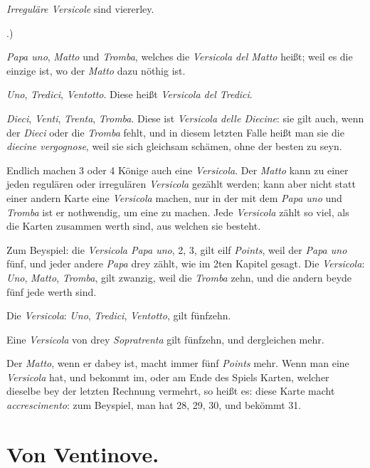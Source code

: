 \documentclass[11pt,a6paper,twoside]{article}
\renewenvironment{enumerate}{
  \begin{list}
    {\textsc{\arabic{enumi}}.)}
    {\usecounter{enumi}
      \setlength{\labelwidth}{2em}
      \setlength{\labelsep}{0.5em}
      \setlength{\itemsep}{0pt}
      \setlength{\parsep}{0pt}
      \setlength{\leftmargin}{1.5em}
      \setlength{\itemindent}{0em} %
    }
}{\end{list}}
\begin{document}
\textit{Irreguläre Versicole} sind viererley.
\begin{enumerate}
\item \textit{Papa uno}, \textit{Matto} und \textit{Tromba}, welches die \textit{Versicola del Matto} heißt; weil es die einzige ist, wo der \textit{Matto} dazu nöthig ist.
\item \textit{Uno}, \textit{Tredici}, \textit{Ventotto}. Diese heißt \textit{Versicola del Tredici}.
\item \textit{Dieci}, \textit{Venti}, \textit{Trenta}, \textit{Tromba}. Diese ist \textit{Versicola delle Diecine}: sie gilt auch, wenn der \textit{Dieci} oder die \textit{Tromba} fehlt, und in diesem letzten Falle heißt man sie die \textit{diecine vergognose}, weil sie sich gleichsam schämen, ohne der besten zu seyn.
\item Endlich machen 3 oder 4 Könige auch eine \textit{Versicola}. Der \textit{Matto} kann zu einer jeden regulären oder irregulären \textit{Versicola} gezählt werden; kann aber nicht statt einer andern Karte eine \textit{Versicola} machen, nur in der mit dem \textit{Papa uno} und \textit{Tromba} ist er nothwendig, um eine zu machen. Jede \textit{Versicola} zählt so viel, als die Karten zusammen werth sind, aus welchen sie besteht.
\end{enumerate}

Zum Beyspiel: die \textit{Versicola Papa uno}, 2, 3, gilt eilf \textit{Points}, weil der \textit{Papa uno} fünf, und jeder andere \textit{Papa} drey zählt, wie im 2ten Kapitel gesagt. Die \textit{Versicola}: \textit{Uno}, \textit{Matto}, \textit{Tromba}, gilt zwanzig, weil die \textit{Tromba} zehn, und die andern beyde fünf jede werth sind.

Die \textit{Versicola}: \textit{Uno}, \textit{Tredici}, \textit{Ventotto}, gilt fünfzehn.

Eine \textit{Versicola} von drey \textit{Sopratrenta} gilt fünfzehn, und dergleichen mehr.

Der \textit{Matto}, wenn er dabey ist, macht immer fünf \textit{Points} mehr.
Wenn man eine \textit{Versicola} hat, und bekommt im, oder am Ende des Spiels Karten, welcher dieselbe bey der letzten Rechnung vermehrt, so heißt es: diese Karte macht \textit{accrescimento}: zum Beyspiel, man hat 28, 29, 30, und bek\"ommt 31.


\section{Von Ventinove.}
\end{document}
